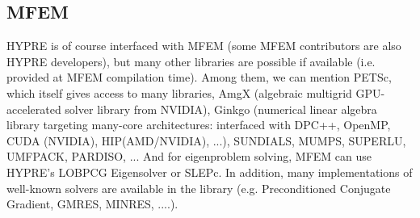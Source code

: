 \documentclass[12pt]{article}
\begin{document}
\subsection{MFEM}
HYPRE is of course interfaced with MFEM (some MFEM contributors are also HYPRE developers), but many other libraries are possible if available (i.e. provided at MFEM compilation time).
Among them, we can mention PETSc, which itself gives access to many libraries, AmgX (algebraic multigrid GPU-accelerated solver library from NVIDIA), Ginkgo (numerical linear algebra library targeting many-core architectures: interfaced with DPC++, OpenMP, CUDA (NVIDIA), HIP(AMD/NVIDIA), ...), SUNDIALS, MUMPS, SUPERLU, UMFPACK, PARDISO, ...
And for eigenproblem solving, MFEM can use HYPRE's LOBPCG Eigensolver or SLEPc.
In addition, many implementations of well-known solvers are available in the library (e.g. Preconditioned Conjugate Gradient, GMRES, MINRES, ....).
\end{document}
